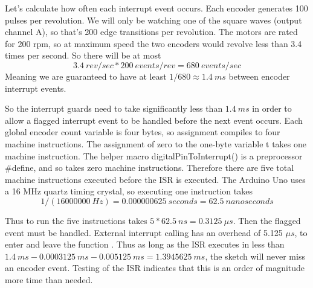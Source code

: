 Let's calculate how often each interrupt event occurs. Each encoder generates 100 pulses per revolution. We will only be watching one of the square waves (output channel A), so that's 200 edge transitions per revolution. The motors are rated for 200 rpm, so at maximum speed the two encoders would revolve less than 3.4 times per second. So there will be at most \[3.4\ rev/sec * 200\ events/rev = 680\ events/sec\]
Meaning we are guaranteed to have at least \(1 / 680 \approx 1.4\ ms\) between encoder interrupt events.

So the interrupt guards need to take significantly less than \(1.4\ ms\) in order to allow a flagged interrupt event to be handled before the next event occurs. Each global encoder count variable is four bytes, so assignment compiles to four machine instructions. The assignment of zero to the one-byte variable t takes one machine instruction. The helper macro digitalPinToInterrupt() is a preprocessor \#define, and so takes zero machine instructions. Therefore there are five total machine instructions executed before the ISR is executed. The Arduino Uno uses a 16 MHz quartz timing crystal, so executing one instruction takes \[1 / (16000000\ Hz) = 0.000000625\ seconds = 62.5\ nanoseconds\]

Thus to run the five instructions takes \(5 * 62.5\ ns = 0.3125\ \mu s\). Then the flagged event must be handled. External interrupt calling has an overhead of 5.125 \(\mu s\), to enter and leave the function \cite{gammonInterrupts}. Thus as long as the ISR executes in less than \(1.4\ ms - 0.0003125\ ms - 0.005125\ ms = 1.3945625\ ms\), the sketch will never miss an encoder event. Testing of the ISR indicates that this is an order of magnitude more time than needed.